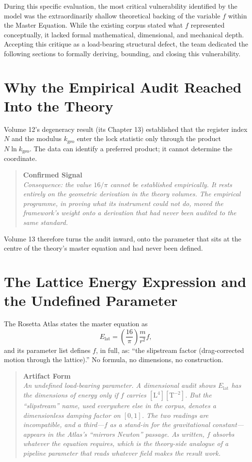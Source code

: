 \documentclass[11pt, letterpaper, openany]{book}
\begin{document}
During this specific evaluation, the most critical vulnerability identified by the model was the extraordinarily shallow theoretical backing of the variable $f$ within the Master Equation. While the existing corpus stated what $f$ represented conceptually, it lacked formal mathematical, dimensional, and mechanical depth. Accepting this critique as a load-bearing structural defect, the team dedicated the following sections to formally deriving, bounding, and closing this vulnerability.

\section{Why the Empirical Audit Reached Into the Theory}

Volume 12's degeneracy result (its Chapter 13) established that the register index $N$ and the modulus $k_{\text{geo}}$ enter the lock statistic only through the product $N \ln k_{\text{geo}}$. The data can identify a preferred product; it cannot determine the coordinate.

\begin{quote}
\textbf{Confirmed Signal} \\
\textit{Consequence: the value $16/\pi$ cannot be established empirically. It rests entirely on the geometric derivation in the theory volumes. The empirical programme, in proving what its instrument could not do, moved the framework's weight onto a derivation that had never been audited to the same standard.}
\end{quote}

Volume 13 therefore turns the audit inward, onto the parameter that sits at the centre of the theory's master equation and had never been defined.

\section{The Lattice Energy Expression and the Undefined Parameter}

The Rosetta Atlas states the master equation as
\begin{equation}
E_{\text{lat}} = \left(\frac{16}{\pi}\right) \frac{m}{r^2} f, \tag{3.1}
\end{equation}
and its parameter list defines $f$, in full, as: ``the slipstream factor (drag-corrected motion through the lattice).'' No formula, no dimensions, no construction.

\begin{quote}
\textbf{Artifact Form} \\
\textit{An undefined load-bearing parameter. A dimensional audit shows $E_{\text{lat}}$ has the dimensions of energy only if $f$ carries $[\mathrm{L}^4][\mathrm{T}^{-2}]$. But the ``slipstream'' name, used everywhere else in the corpus, denotes a dimensionless damping factor on $[0,1]$. The two readings are incompatible, and a third—$f$ as a stand-in for the gravitational constant—appears in the Atlas's ``mirrors Newton'' passage. As written, $f$ absorbs whatever the equation requires, which is the theory-side analogue of a pipeline parameter that reads whatever field makes the result work.}
\end{quote}
\end{document}
